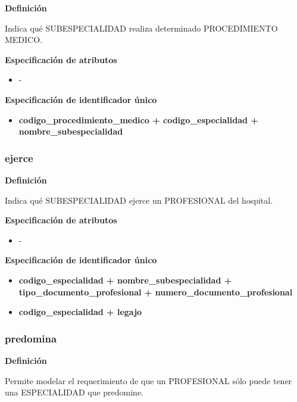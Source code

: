 \documentclass[a4paper,11pt]{article}
\begin{document}
\textbf{Definición}

Indica qué SUBESPECIALIDAD realiza determinado PROCEDIMIENTO MEDICO.

\textbf{Especificación de atributos}

\begin{itemize}
\item -
\end{itemize}

\textbf{Especificación de identificador único}

\begin{itemize}

     \item \textbf{codigo\_procedimiento\_medico + codigo\_especialidad + nombre\_subespecialidad}
\end{itemize}

\subsubsection{\textbf{ejerce}}

\textbf{Definición}

Indica qué SUBESPECIALIDAD ejerce un PROFESIONAL del hospital.

\textbf{Especificación de atributos}

\begin{itemize}
\item -
\end{itemize}

\textbf{Especificación de identificador único}

\begin{itemize}

    \item \textbf{codigo\_especialidad + nombre\_subespecialidad + tipo\_documento\_profesional + numero\_documento\_profesional}

    \item \textbf{codigo\_especialidad + legajo}
	
	
\end{itemize}

\subsubsection{\textbf{predomina}}

\textbf{Definición}

Permite modelar el requerimiento de que un PROFESIONAL sólo puede tener una ESPECIALIDAD 
que predomine.
\end{document}
